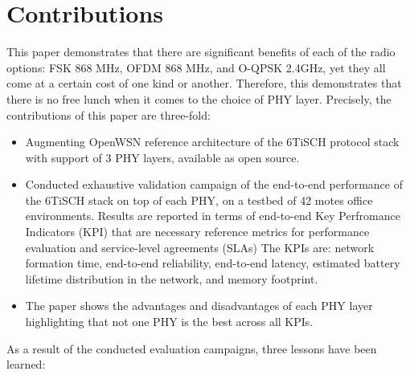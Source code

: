 \documentclass[journal]{IEEEtran}
\newcommand{\fsk}          {FSK 868 MHz}
\newcommand{\oqpsk}        {O-QPSK 2.4GHz}
\newcommand{\ofdm}         {OFDM 868 MHz}
\begin{document}
\section{Contributions}
\label{sec:contributions}

This paper demonstrates that there are significant benefits of each of the radio options: \fsk, \ofdm, and \oqpsk, yet they all come at a certain cost of one kind or another.
Therefore, this demonstrates that there is no free lunch when it comes to the choice of PHY layer.
Precisely, the contributions of this paper are three-fold:

%
\begin{itemize}
    \item Augmenting OpenWSN reference architecture of the 6TiSCH protocol stack with support of 3 PHY layers, available as open source.
    \item Conducted exhaustive validation campaign of the end-to-end performance of the 6TiSCH stack on top of each PHY, on a testbed of 42 motes office environments.
    Results are reported in terms of end-to-end Key Perfromance Indicators (KPI) that are necessary reference metrics for performance evaluation and service-level agreements (SLAs)
    The KPIs are: 
        network formation time,
        end-to-end reliability,
        end-to-end latency, 
        estimated battery lifetime distribution in the network,
        and memory footprint.
    \item The paper shows the advantages and disadvantages of each PHY layer highlighting that not one PHY is the best across all KPIs.
\end{itemize}

As a result of the conducted evaluation campaigns, three lessons have been learned:
\end{document}
